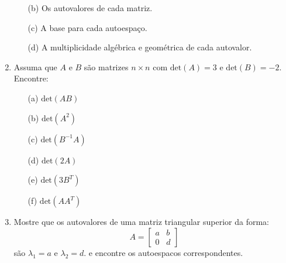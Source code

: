 \documentclass[a4paper,12pt]{article}
\begin{document}
\begin{enumerate}
\begin{enumerate}
    \item[(b)] Os autovalores de cada matriz.
    \item[(c)] A base para cada autoespaço.
    \item[(d)] A multiplicidade algébrica e geométrica de cada autovalor. 
\end{enumerate}
\item  Assuma que $A$ e $B$ são matrizes $n \times n$ com $\text{det}(A) = 3$ e $\text{det}(B) = -2$. Encontre:
\begin{enumerate}
    \item [(a)] $\text{det}(AB)$
    \item [(b)] $\text{det}(A^2)$
    \item [(c)] $\text{det}(B^{-1}A)$
    \item [(d)] $\text{det}(2A)$
    \item [(e)] $\text{det}(3B^T)$
    \item [(f)] $\text{det}(A A^T)$
\end{enumerate}
\item Mostre que os autovalores de uma matriz triangular superior da forma:
$$
A = \begin{bmatrix} a & b \\ 0 & d \end{bmatrix}
$$
são $\lambda_1 = a$ e $\lambda_2 = d$. e encontre os autoespacos correspondentes.
\end{enumerate}
\end{document}
